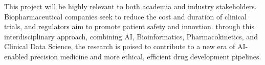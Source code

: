 This project will be highly relevant to both academia and industry stakeholders. Biopharmaceutical companies
seek to reduce the cost and duration of clinical trials, and regulators aim to promote patient safety and innovtion.
through this interdisciplinary approach, combining AI, Bioinformatics, Pharmacokinetics, and Clinical Data Science,
the research is poised to contribute to a new era of AI-enabled precision medicine and more ethical, efficient drug development pipelines.
